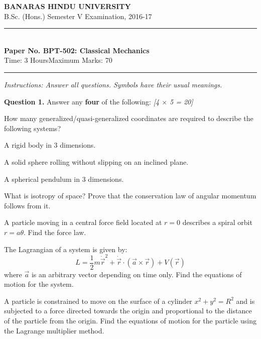 \documentclass[11pt,a4paper]{article}
\newcommand{\pts}[1]{\hfill   \textit{[#1]}}
\begin{document}
\begin{center}
  {\large\bfseries BANARAS HINDU UNIVERSITY}\\[2pt]
  {\normalsize B.Sc. (Hons.) Semester V Examination, 2016-17}\\[6pt]
  \rule{0.8\linewidth}{0.5pt}\\[6pt]
  {\large\bfseries Paper No. BPT-502: Classical Mechanics}\\[4pt]
  {\normalsize Time: 3 Hours\hfill Maximum Marks: 70}
\end{center}
\rule{\linewidth}{0.4pt}
\smallskip



\noindent   \textit{Instructions: Answer all questions. Symbols have their usual meanings.}
\bigskip




\noindent   \textbf{Question 1.} Answer any   \textbf{four} of the following: \pts{4 $ \times$ 5 = 20}

\begin{parts}
  \item How many generalized/quasi-generalized coordinates are required to describe the following systems?
    
\begin{parts}
      \item A rigid body in 3 dimensions.
      \item A solid sphere rolling without slipping on an inclined plane.
      \item A spherical pendulum in 3 dimensions.
    \end{parts}
  \item What is isotropy of space? Prove that the conservation law of angular momentum follows from it.
  \item A particle moving in a central force field located at $r = 0$ describes a spiral orbit $r = a \theta$. Find the force law.
  \item The Lagrangian of a system is given by:
    \[ L = \frac{1}{2} m \dot{\vec{r}}^2 + \dot{\vec{r}} \cdot (\vec{a}  \times \vec{r}) + V(\vec{r}) \]
    where $\vec{a}$ is an arbitrary vector depending on time only. Find the equations of motion for the system.
  \item A particle is constrained to move on the surface of a cylinder $x^2 + y^2 = R^2$ and is subjected to a force directed towards the origin and proportional to the distance of the particle from the origin. Find the equations of motion for the particle using the Lagrange multiplier method.
\end{parts}
\end{document}
